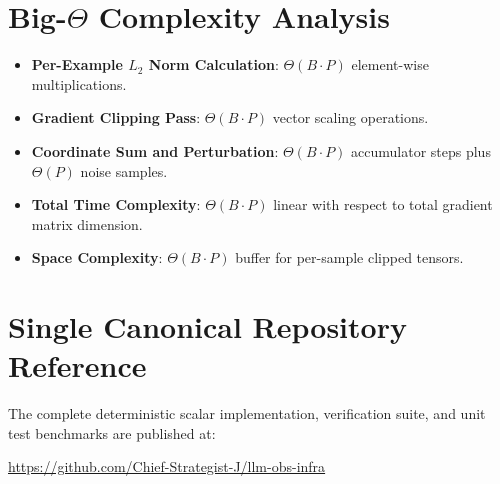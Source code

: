 \documentclass[11pt,a4paper]{article}
\theoremstyle{definition}
\begin{document}
\section{Big-$\Theta$ Complexity Analysis}

\begin{itemize}
    \item \textbf{Per-Example $L_2$ Norm Calculation}: $\Theta(B \cdot P)$ element-wise multiplications.
    \item \textbf{Gradient Clipping Pass}: $\Theta(B \cdot P)$ vector scaling operations.
    \item \textbf{Coordinate Sum and Perturbation}: $\Theta(B \cdot P)$ accumulator steps plus $\Theta(P)$ noise samples.
    \item \textbf{Total Time Complexity}: $\Theta(B \cdot P)$ linear with respect to total gradient matrix dimension.
    \item \textbf{Space Complexity}: $\Theta(B \cdot P)$ buffer for per-sample clipped tensors.
\end{itemize}

\section{Single Canonical Repository Reference}

The complete deterministic scalar implementation, verification suite, and unit test benchmarks are published at:
\begin{center}
\url{https://github.com/Chief-Strategist-J/llm-obs-infra}
\end{center}
\end{document}
